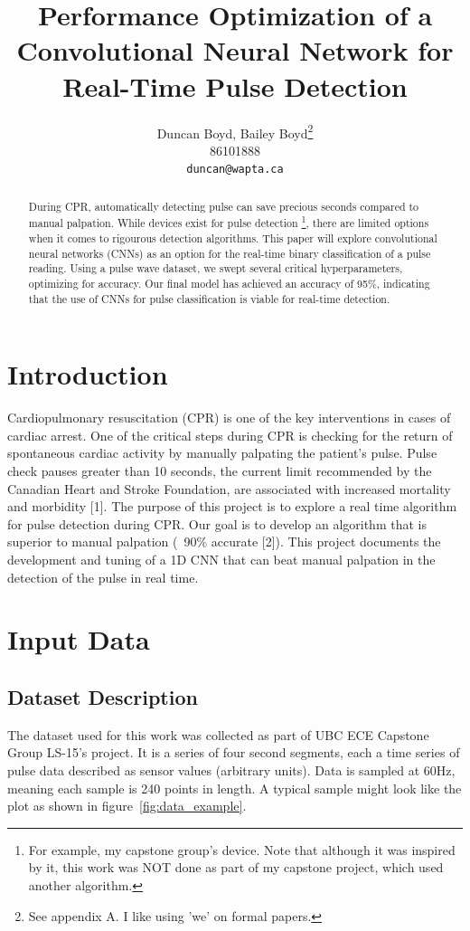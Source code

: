 \documentclass{article}
\title{Performance Optimization of a Convolutional Neural Network for Real-Time Pulse Detection}
\author{
  Duncan Boyd, Bailey Boyd\thanks{See appendix A. I like using 'we' on formal papers.} \\
  86101888 \\
  \texttt{duncan@wapta.ca} \\
}
\begin{document}
\maketitle


\begin{abstract}
  During CPR, automatically detecting pulse can save precious seconds compared to manual palpation. While devices exist for pulse detection \footnote{For example, my capstone group's device. Note that although it was inspired by it, this work was NOT done as part of my capstone project, which used another algorithm.}, there are limited options when it comes to rigourous detection algorithms. This paper will explore convolutional neural networks (CNNs) as an option for the real-time binary classification of a pulse reading. Using a pulse wave dataset, we swept several critical hyperparameters, optimizing for accuracy. Our final model has achieved an accuracy of 95\%, indicating that the use of CNNs for pulse classification is viable for real-time detection.
\end{abstract}

\section{Introduction}

Cardiopulmonary resuscitation (CPR) is one of the key interventions in cases of cardiac arrest. One of the critical steps during CPR is checking for the return of spontaneous cardiac activity by manually palpating the patient's pulse. Pulse check pauses greater than 10 seconds, the current limit recommended by the Canadian Heart and Stroke Foundation, are associated with increased mortality and morbidity [1]. The purpose of this project is to explore a real time algorithm for pulse detection during CPR. Our goal is to develop an algorithm that is superior to manual palpation (~90\% accurate [2]). This project documents the development and tuning of a 1D CNN that can beat manual palpation in the detection of the pulse in real time.

\section{Input Data}

\subsection{Dataset Description}

The dataset used for this work was collected as part of UBC ECE Capstone Group LS-15's project. It is a series of four second segments, each a time series of pulse data described as sensor values (arbitrary units). Data is sampled at 60Hz, meaning each sample is 240 points in length. A typical sample might look like the plot as shown in figure~\ref{fig:data_example}.
\end{document}
